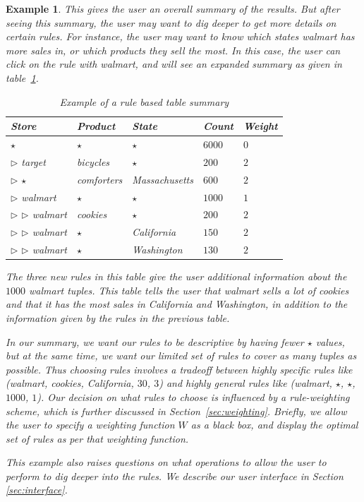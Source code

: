 \documentclass{sig-alternate}
\newtheorem{example}[definition]{Example}
\begin{document}
\begin{example}
This gives the user an overall summary of the results. But after seeing this summary, the user may want to dig deeper to get more details on certain rules. For instance, the user may want to know which states walmart has more sales in, or which products they sell the most. In this case, the user can click on the rule with walmart, and will see an expanded summary as given in table~\ref{table:introexample2}. 

\begin{table}
\centering
\begin{tabular}{| l | l | l | l | l |}
\hline Store & Product & State & Count & Weight \\
\hline
$\star$ & $\star$ & $\star$ & $6000$ & $0$ \\  \cline{1-5}
$\triangleright$ target & bicycles & $\star$ & $200$ & $2$ \\ \cline{1-5}
$\triangleright$ $\star$ & comforters & Massachusetts & $600$ & $2$ \\ \cline{1-5}
$\triangleright$ walmart & $\star$ & $\star$ & $1000$ & $1$ \\ \cline{2-5}
$\triangleright$ $\triangleright$ walmart & cookies & $\star$ & $200$ & $2$ \\ \cline{2-5}
$\triangleright$ $\triangleright$ walmart & $\star$ & California & $150$ & $2$ \\ \cline{2-5}
$\triangleright$ $\triangleright$ walmart & $\star$ & Washington & $130$ & $2$ \\ \hline
\end{tabular}
\caption{Example of a rule based table summary \label{table:introexample2}}
\end{table}

The three new rules in this table give the user additional information about the $1000$ walmart tuples. This table tells the user that walmart sells a lot of cookies and that it has the most sales in California and Washington, in addition to the information given by the rules in the previous table.

In our summary, we want our rules to be descriptive by having fewer $\star$ values, but at the same time, we want our limited set of rules to cover as many tuples as possible. Thus choosing rules involves a tradeoff between highly specific rules like (walmart, cookies, California, $30$, $3$) and highly general rules like (walmart, $\star$, $\star$, $1000$, $1$). Our decision on what rules to choose is influenced by a rule-weighting scheme, which is further discussed in Section~\ref{sec:weighting}. Briefly, we allow the user to specify a weighting function $W$ as a black box, and display the optimal set of rules as per that weighting function. 

This example also raises questions on what operations to allow the user to perform to dig deeper into the rules. We describe our user interface in Section \ref{sec:interface}. 
\end{example}
\end{document}

